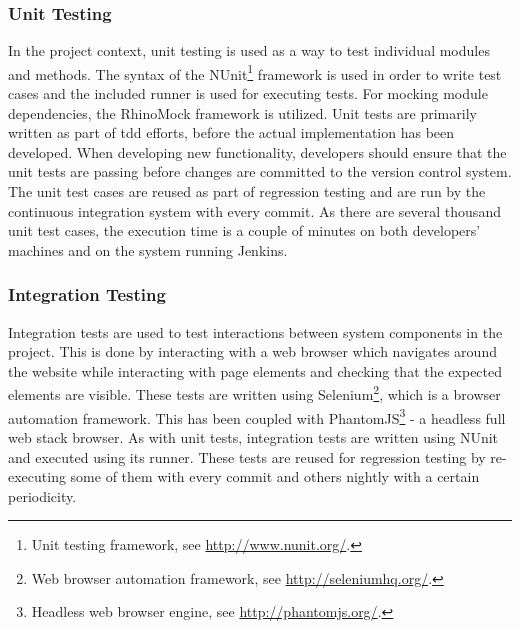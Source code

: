 \documentclass[a4paper,english,12pt]{report}
\begin{document}
\subsubsection{Unit Testing}
In the project context, unit testing is used as a way to test individual modules and methods. The syntax of the NUnit\footnote{Unit testing framework, see \url{http://www.nunit.org/}.} framework is used in order to write test cases and the included runner is used for executing tests. For mocking module dependencies, the RhinoMock framework is utilized. Unit tests are primarily written as part of \gls{tdd} efforts, before the actual implementation has been developed. When developing new functionality, developers should ensure that the unit tests are passing before changes are committed to the version control system. The unit test cases are reused as part of regression testing and are run by the continuous integration system with every commit. As there are several thousand unit test cases, the execution time is a couple of minutes on both developers' machines and on the system running Jenkins.

\subsubsection{Integration Testing}
Integration tests are used to test interactions between system components in the project. This is done by interacting with a web browser which navigates around the website while interacting with page elements and checking that the expected elements are visible. These tests are written using Selenium\footnote{Web browser automation framework, see \url{http://seleniumhq.org/}.}, which is a browser automation framework. This has been coupled with PhantomJS\footnote{Headless web browser engine, see \url{http://phantomjs.org/}.} - a headless full web stack browser. As with unit tests, integration tests are written using NUnit and executed using its runner. These tests are reused for regression testing by re-executing some of them with every commit and others nightly with a certain periodicity.
\end{document}

